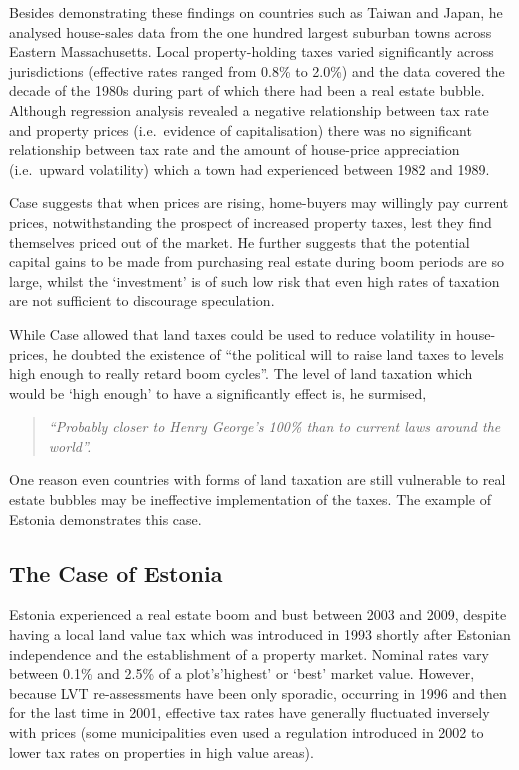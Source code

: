 \documentclass[]{tufte-handout}
\begin{document}
Besides demonstrating these findings on countries such as Taiwan and
Japan, he analysed house-sales data from the one hundred largest
suburban towns across Eastern Massachusetts. Local property-holding
taxes varied significantly across jurisdictions (effective rates ranged
from 0.8\% to 2.0\%) and the data covered the decade of the 1980s during
part of which there had been a real estate bubble. Although regression
analysis revealed a negative relationship between tax rate and property
prices (i.e.~evidence of capitalisation) there was no significant
relationship between tax rate and the amount of house-price appreciation
(i.e.~upward volatility) which a town had experienced between 1982 and
1989.

Case suggests that when prices are rising, home-buyers may willingly pay
current prices, notwithstanding the prospect of increased property
taxes, lest they find themselves priced out of the market. He further
suggests that the potential capital gains to be made from purchasing
real estate during boom periods are so large, whilst the `investment' is
of such low risk that even high rates of taxation are not sufficient to
discourage speculation.

While Case allowed that land taxes could be used to reduce volatility in
house-prices, he doubted the existence of ``the political will to raise
land taxes to levels high enough to really retard boom cycles''. The
level of land taxation which would be `high enough' to have a
significantly effect is, he surmised,

\begin{quote}
\emph{``Probably closer to Henry George's 100\% than to current laws
around the world''.}
\end{quote}

One reason even countries with forms of land taxation are still
vulnerable to real estate bubbles may be ineffective implementation of
the taxes. The example of Estonia demonstrates this case.

\hypertarget{the-case-of-estonia}{%
\subsection{The Case of Estonia}\label{the-case-of-estonia}}

Estonia experienced a real estate boom and bust between 2003 and 2009,
despite having a local land value tax which was introduced in 1993
shortly after Estonian independence and the establishment of a property
market. Nominal rates vary between 0.1\% and 2.5\% of a plot's'highest'
or `best' market value. However, because LVT re-assessments have been
only sporadic, occurring in 1996 and then for the last time in 2001,
effective tax rates have generally fluctuated inversely with prices
(some municipalities even used a regulation introduced in 2002 to lower
tax rates on properties in high value areas).
\end{document}
